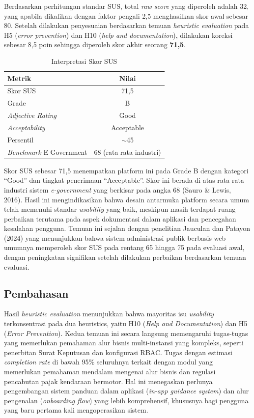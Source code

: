 \documentclass[conference]{IEEEtran}
\begin{document}
Berdasarkan perhitungan standar SUS, total \emph{raw score} yang diperoleh adalah 32, yang
apabila dikalikan dengan faktor pengali 2,5 menghasilkan skor awal sebesar 80. Setelah
dilakukan penyesuaian berdasarkan temuan \emph{heuristic evaluation} pada H5 (\emph{error
prevention}) dan H10 (\emph{help and documentation}), dilakukan koreksi sebesar 8,5 poin
sehingga diperoleh skor akhir seorang \textbf{71,5}.

\begin{table}[!t]
\centering
\caption{Interpretasi Skor SUS}
\label{tab:sus-interpretation}
\begin{tabular}{|l|c|}
\hline
\textbf{Metrik} & \textbf{Nilai} \\
\hline
Skor SUS & 71,5 \\
Grade & B \\
\emph{Adjective Rating} & Good \\
\emph{Acceptability} & Acceptable \\
Persentil & $\sim$45 \\
\emph{Benchmark} E-Government & 68 (rata-rata industri) \\
\hline
\end{tabular}
\end{table}

Skor SUS sebesar 71,5 menempatkan platform ini pada Grade B dengan kategori ``Good'' dan
tingkat penerimaan ``Acceptable''. Skor ini berada di atas rata-rata industri sistem
\emph{e-government} yang berkisar pada angka 68 (Sauro \& Lewis, 2016). Hasil ini
mengindikasikan bahwa desain antarmuka platform secara umum telah memenuhi standar
\emph{usability} yang baik, meskipun masih terdapat ruang perbaikan terutama pada aspek
dokumentasi dalam aplikasi dan pencegahan kesalahan pengguna. Temuan ini sejalan dengan
penelitian Jauculan dan Patayon (2024) yang menunjukkan bahwa sistem administrasi publik
berbasis web umumnya memperoleh skor SUS pada rentang 65 hingga 75 pada evaluasi awal,
dengan peningkatan signifikan setelah dilakukan perbaikan berdasarkan temuan evaluasi.

\subsection{Pembahasan}
\label{subsec:pembahasan}

Hasil \emph{heuristic evaluation} menunjukkan bahwa mayoritas isu \emph{usability}
terkonsentrasi pada dua heuristics, yaitu H10 (\emph{Help and Documentation}) dan
H5 (\emph{Error Prevention}). Kedua temuan ini secara langsung memengaruhi tugas-tugas
yang memerlukan pemahaman alur bisnis multi-instansi yang kompleks, seperti penerbitan
Surat Keputusan dan konfigurasi RBAC. Tugas dengan estimasi \emph{completion rate} di
bawah 95\% seluruhnya terkait dengan modul yang memerlukan pemahaman mendalam mengenai
alur bisnis dan regulasi pencabutan pajak kendaraan bermotor. Hal ini menegaskan
perlunya pengembangan sistem panduan dalam aplikasi (\emph{in-app guidance system}) dan
alur pengenalan (\emph{onboarding flow}) yang lebih komprehensif, khususnya bagi
pengguna yang baru pertama kali mengoperasikan sistem.
\end{document}
